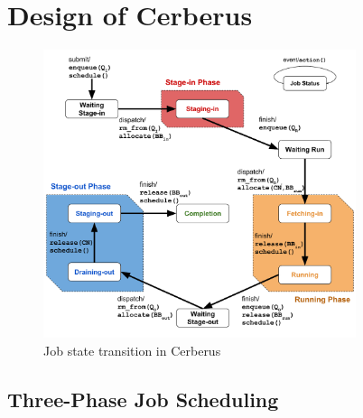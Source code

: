 \section{Design of Cerberus}
\label{Sec:Scheduler}

\begin{figure}[htp]
\centering
        \includegraphics[width=3.6in]{3PhaseJobFSM}
        \caption{Job state transition in Cerberus}
\label{Fig:JobFSM}
\end{figure}

\subsection{Three-Phase Job Scheduling}



